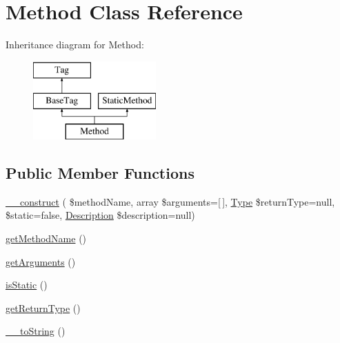 \hypertarget{classphp_documentor_1_1_reflection_1_1_doc_block_1_1_tags_1_1_method}{}\section{Method Class Reference}
\label{classphp_documentor_1_1_reflection_1_1_doc_block_1_1_tags_1_1_method}
Inheritance diagram for Method\+:\begin{figure}[H]
\begin{center}
\leavevmode
\includegraphics[height=3.000000cm]{classphp_documentor_1_1_reflection_1_1_doc_block_1_1_tags_1_1_method}
\end{center}
\end{figure}
\subsection*{Public Member Functions}
\begin{DoxyCompactItemize}
\item 
\mbox{\hyperlink{classphp_documentor_1_1_reflection_1_1_doc_block_1_1_tags_1_1_method_a27f6acee473305c45852767d76320e97}{\+\_\+\+\_\+construct}} ( \$method\+Name, array \$arguments=\mbox{[}$\,$\mbox{]}, \mbox{\hyperlink{interfacephp_documentor_1_1_reflection_1_1_type}{Type}} \$return\+Type=null, \$static=false, \mbox{\hyperlink{classphp_documentor_1_1_reflection_1_1_doc_block_1_1_description}{Description}} \$description=null)
\item 
\mbox{\hyperlink{classphp_documentor_1_1_reflection_1_1_doc_block_1_1_tags_1_1_method_a0fa2079426d0262e759c4105fa4e9163}{get\+Method\+Name}} ()
\item 
\mbox{\hyperlink{classphp_documentor_1_1_reflection_1_1_doc_block_1_1_tags_1_1_method_a1d4c324c5a088be98d99d3efbf3502e1}{get\+Arguments}} ()
\item 
\mbox{\hyperlink{classphp_documentor_1_1_reflection_1_1_doc_block_1_1_tags_1_1_method_a9b2dd808ffcd764782fb11b3ea583a8d}{is\+Static}} ()
\item 
\mbox{\hyperlink{classphp_documentor_1_1_reflection_1_1_doc_block_1_1_tags_1_1_method_a8d833642f3f98773f6ad2d64943be1b2}{get\+Return\+Type}} ()
\item 
\mbox{\hyperlink{classphp_documentor_1_1_reflection_1_1_doc_block_1_1_tags_1_1_method_a7516ca30af0db3cdbf9a7739b48ce91d}{\+\_\+\+\_\+to\+String}} ()
\end{DoxyCompactItemize}
